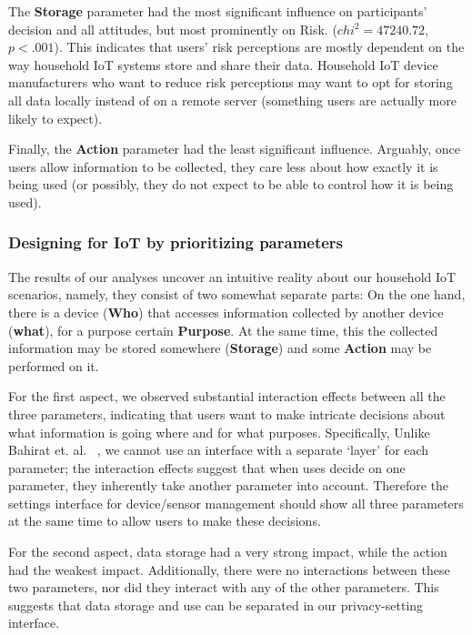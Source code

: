 The \textbf{Storage} parameter had the most significant influence on participants' decision and all attitudes, but most prominently on Risk. ($chi^2 = 47240.72$,  $p < .001$). This indicates that users' risk perceptions are mostly dependent on the way household IoT systems store and share their data. Household IoT device manufacturers who want to reduce risk perceptions may want to opt for storing all data locally instead of on a remote server (something users are actually more likely to expect). %

Finally, the \textbf{Action} parameter had the least significant influence. Arguably, once users allow information to be collected, they care less about how exactly it is being used (or possibly, they do not expect to be able to control how it is being used).

\subsubsection{Designing for IoT by prioritizing parameters}
The results of our analyses uncover an intuitive reality about our household IoT scenarios, namely, they consist of two somewhat separate parts: On the one hand, there is a device (\textbf{Who}) that accesses information collected by another device (\textbf{what}), for a purpose certain \textbf{Purpose}. At the same time, this the collected information may be stored somewhere (\textbf{Storage}) and some \textbf{Action} may be performed on it. 

For the first aspect, we observed substantial interaction effects between all the three parameters, indicating that users want to make intricate decisions about what information is going where and for what purposes. Specifically, Unlike Bahirat et. al. ~\cite{bahiratiui2018}, we cannot use an interface with a separate `layer' for each parameter; the interaction effects suggest that when uses decide on one parameter, they inherently take another parameter into account. Therefore the settings interface for device/sensor management should show all three parameters at the same time to allow users to make these decisions.

For the second aspect, data storage had a very strong impact, while the action had the weakest impact. Additionally, there were no interactions between these two parameters, nor did they interact with any of the other parameters. This suggests that data storage and use can be separated in our privacy-setting interface. 

